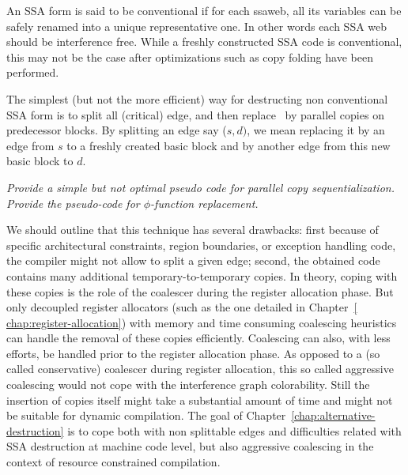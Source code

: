 An SSA form is said to be conventional if for each ssaweb, all its variables can be safely renamed into a unique representative one. In other words each SSA web should be interference free. While a freshly constructed SSA code is conventional, this may not be the case after optimizations such as copy folding have been performed.

The simplest (but not the more efficient) way for destructing non conventional SSA form is to split all (critical) edge, and then replace \phiops\ by parallel copies on predecessor blocks. By splitting an edge say ($s,d)$, we mean replacing it by an edge from $s$ to a freshly created basic block and by another edge from this new basic block to $d$.

{\em Provide a simple but not optimal pseudo code for parallel copy sequentialization. Provide the pseudo-code for $\phi$-function replacement.}

We should outline that this technique has several drawbacks: first because of specific architectural constraints, region boundaries, or exception handling code, the compiler might not allow to split a given edge; second, the obtained code contains many additional temporary-to-temporary copies. In theory, coping with these copies is the role of the coalescer during the register allocation phase. But only decoupled register allocators (such as the one detailed in Chapter~\ref{ chap:register-allocation}) with memory and time consuming coalescing heuristics can handle the removal of these copies efficiently. Coalescing can also, with less efforts, be handled prior to the register allocation phase. As opposed to a (so called conservative) coalescer during register allocation, this so called aggressive coalescing would not cope with the interference graph colorability. Still the insertion of copies itself might take a substantial amount of time and might not be suitable for dynamic compilation. The goal of Chapter~\ref{chap:alternative-destruction} is to cope both with non splittable edges and difficulties related with SSA destruction at machine code level, but also aggressive coalescing in the context of resource constrained compilation.


